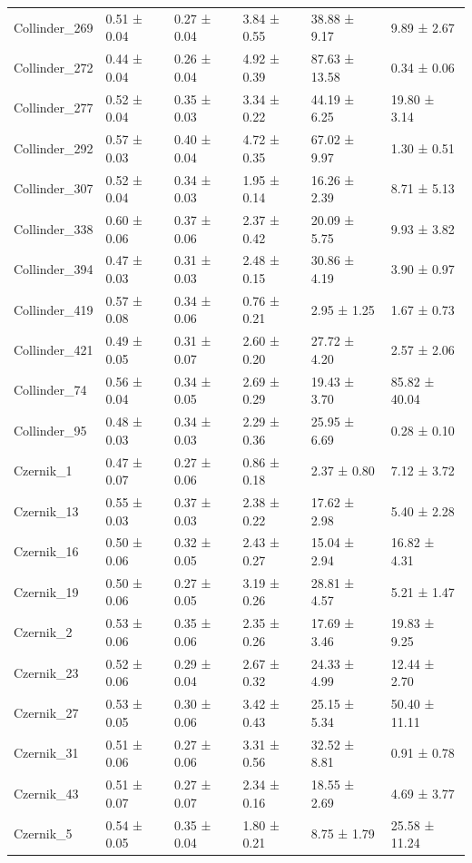 \begin{tabular}{llllll}
Collinder_269 & 0.51 ± 0.04 & 0.27 ± 0.04 & 3.84 ± 0.55 & 38.88 ± 9.17 & 9.89 ± 2.67 \\
Collinder_272 & 0.44 ± 0.04 & 0.26 ± 0.04 & 4.92 ± 0.39 & 87.63 ± 13.58 & 0.34 ± 0.06 \\
Collinder_277 & 0.52 ± 0.04 & 0.35 ± 0.03 & 3.34 ± 0.22 & 44.19 ± 6.25 & 19.80 ± 3.14 \\
Collinder_292 & 0.57 ± 0.03 & 0.40 ± 0.04 & 4.72 ± 0.35 & 67.02 ± 9.97 & 1.30 ± 0.51 \\
Collinder_307 & 0.52 ± 0.04 & 0.34 ± 0.03 & 1.95 ± 0.14 & 16.26 ± 2.39 & 8.71 ± 5.13 \\
Collinder_338 & 0.60 ± 0.06 & 0.37 ± 0.06 & 2.37 ± 0.42 & 20.09 ± 5.75 & 9.93 ± 3.82 \\
Collinder_394 & 0.47 ± 0.03 & 0.31 ± 0.03 & 2.48 ± 0.15 & 30.86 ± 4.19 & 3.90 ± 0.97 \\
Collinder_419 & 0.57 ± 0.08 & 0.34 ± 0.06 & 0.76 ± 0.21 & 2.95 ± 1.25 & 1.67 ± 0.73 \\
Collinder_421 & 0.49 ± 0.05 & 0.31 ± 0.07 & 2.60 ± 0.20 & 27.72 ± 4.20 & 2.57 ± 2.06 \\
Collinder_74 & 0.56 ± 0.04 & 0.34 ± 0.05 & 2.69 ± 0.29 & 19.43 ± 3.70 & 85.82 ± 40.04 \\
Collinder_95 & 0.48 ± 0.03 & 0.34 ± 0.03 & 2.29 ± 0.36 & 25.95 ± 6.69 & 0.28 ± 0.10 \\
Czernik_1 & 0.47 ± 0.07 & 0.27 ± 0.06 & 0.86 ± 0.18 & 2.37 ± 0.80 & 7.12 ± 3.72 \\
Czernik_13 & 0.55 ± 0.03 & 0.37 ± 0.03 & 2.38 ± 0.22 & 17.62 ± 2.98 & 5.40 ± 2.28 \\
Czernik_16 & 0.50 ± 0.06 & 0.32 ± 0.05 & 2.43 ± 0.27 & 15.04 ± 2.94 & 16.82 ± 4.31 \\
Czernik_19 & 0.50 ± 0.06 & 0.27 ± 0.05 & 3.19 ± 0.26 & 28.81 ± 4.57 & 5.21 ± 1.47 \\
Czernik_2 & 0.53 ± 0.06 & 0.35 ± 0.06 & 2.35 ± 0.26 & 17.69 ± 3.46 & 19.83 ± 9.25 \\
Czernik_23 & 0.52 ± 0.06 & 0.29 ± 0.04 & 2.67 ± 0.32 & 24.33 ± 4.99 & 12.44 ± 2.70 \\
Czernik_27 & 0.53 ± 0.05 & 0.30 ± 0.06 & 3.42 ± 0.43 & 25.15 ± 5.34 & 50.40 ± 11.11 \\
Czernik_31 & 0.51 ± 0.06 & 0.27 ± 0.06 & 3.31 ± 0.56 & 32.52 ± 8.81 & 0.91 ± 0.78 \\
Czernik_43 & 0.51 ± 0.07 & 0.27 ± 0.07 & 2.34 ± 0.16 & 18.55 ± 2.69 & 4.69 ± 3.77 \\
Czernik_5 & 0.54 ± 0.05 & 0.35 ± 0.04 & 1.80 ± 0.21 & 8.75 ± 1.79 & 25.58 ± 11.24 \\

\end{tabular}
